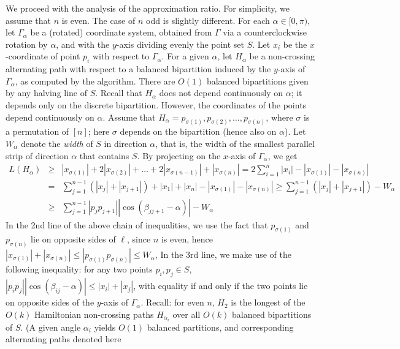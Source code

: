 \documentclass[proceedings]{stacs}
\begin{document}
We proceed with the analysis of the approximation ratio.
For simplicity, we assume that $n$ is even. The case of $n$ odd is
slightly different.
For each $\alpha \in [0,\pi)$, let $\Gamma_\alpha$
be a (rotated) coordinate system, obtained from $\Gamma$ via a
counterclockwise rotation by $\alpha$, and with the $y$-axis dividing
evenly the point set $S$. Let $x_i$ be the $x$-coordinate of point
$p_i$ with respect to $\Gamma_\alpha$.
For a given $\alpha$, let $H_\alpha$ be a non-crossing alternating
path with respect to a balanced bipartition induced by the $y$-axis of
$\Gamma_\alpha$, as computed by the algorithm.
There are $O(1)$ balanced bipartitions given by any halving line of
$S$. Recall that $H_\alpha$ does not depend continuously on
$\alpha$; it depends only on the discrete bipartition. However, the
coordinates of the points depend continuously on $\alpha$.
Assume that $H_\alpha = p_{\sigma(1)},p_{\sigma(2)},\ldots,p_{\sigma(n)}$,
where $\sigma$ is a permutation of $[n]$; here $\sigma$ depends
on the bipartition (hence also on $\alpha$).
Let $W_\alpha$ denote the {\em width} of $S$ in direction $\alpha$, that is,
the width of the smallest parallel strip of direction $\alpha$ that contains $S$.
By projecting on the $x$-axis of $\Gamma_\alpha$, we get
\begin{eqnarray} \label{eq:111}
L(H_\alpha) &\geq& |x_{\sigma(1)}| + 2|x_{\sigma(2)}| +
\ldots+ 2|x_{\sigma(n-1)}| + |x_{\sigma(n)}|
=2\sum_{i=1}^n |x_i| - |x_{\sigma(1)}| - |x_{\sigma(n)}| \nonumber\\
&=& \sum_{j=1}^{n-1} (|x_j| +|x_{j+1}|)+
|x_1|+ |x_n|  - |x_{\sigma(1)}| - |x_{\sigma(n)}|
\geq \sum_{j=1}^{n-1} (|x_{j}| +|x_{j+1}|) -W_\alpha \nonumber\\
&\geq&  \sum_{j=1}^{n-1} |p_{j} p_{j+1}| |\cos(\beta_{j j+1}-\alpha)| -W_\alpha
\end{eqnarray}
In the 2nd line of the above chain of inequalities, we use the fact
that $p_{\sigma(1)}$ and $p_{\sigma(n)}$  lie on opposite sides of $\ell$,
since $n$ is even, hence $ |x_{\sigma(1)}| +|x_{\sigma(n)}|
\leq |p_{\sigma(1)} p_{\sigma(n)}| \leq W_\alpha$,
In the 3rd line, we make use of the following inequality:
for any two points $p_i, p_j \in S$,
$|p_i p_j| |\cos (\beta_{ij}-\alpha) | \leq |x_i| + |x_j|$,
with equality if and only if the two points lie on opposite sides of
the $y$-axis of $\Gamma_\alpha$.
Recall: for even $n$, $H_2$ is the longest of the $O(k)$ Hamiltonian
non-crossing paths $H_{\alpha_i}$ over all $O(k)$ balanced
bipartitions of $S$. (A given angle $\alpha_i$ yields $O(1)$
balanced partitions, and corresponding alternating paths denoted here
\end{document}
